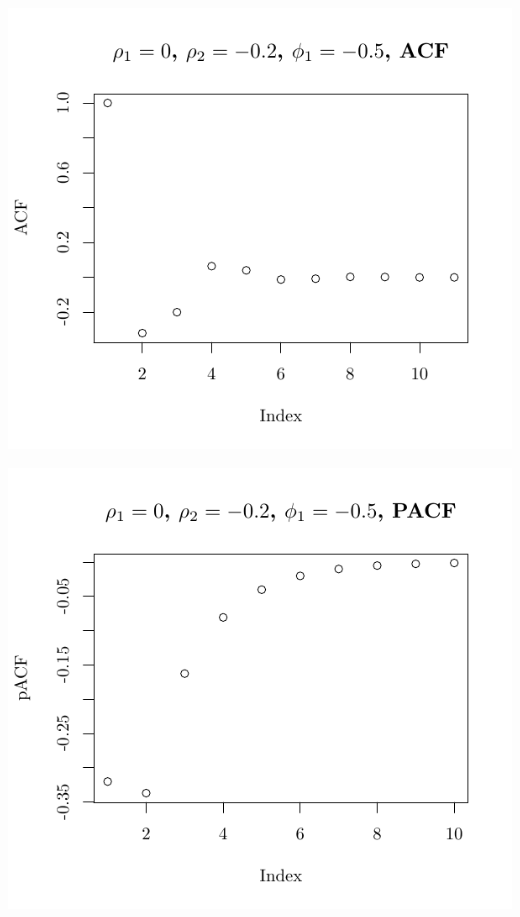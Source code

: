 \documentclass[10pt]{paper}\usepackage[]{graphicx}\usepackage[]{color}
\makeatletter
\def\maxwidth{ %
  \ifdim\Gin@nat@width>\linewidth
    \linewidth
  \else
    \Gin@nat@width
  \fi
}
\newenvironment{knitrout}{}{} %
\makeatother
\begin{document}
\begin{knitrout}
{\centering \includegraphics[width=\maxwidth]{figure/graphics-plotter-53} 

}




{\centering \includegraphics[width=\maxwidth]{figure/graphics-plotter-54} 

}





\end{knitrout}
\end{document}
